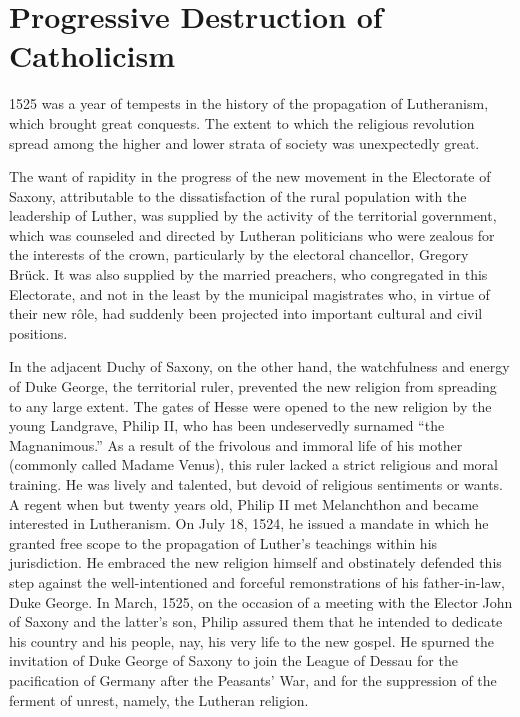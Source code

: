 \section{Progressive Destruction of Catholicism}

1525 was a year of tempests in the history of the propagation of
Lutheranism, which brought great conquests. The extent to which the
religious revolution spread among the higher and lower strata of
society was unexpectedly great.

The want of rapidity in the progress of the new movement in the
Electorate of Saxony, attributable to the dissatisfaction of the rural
population with the leadership of Luther, was supplied by the activity
of the territorial government, which was counseled and directed
by Lutheran politicians who were zealous for the interests of the
crown, particularly by the electoral chancellor, Gregory Brück. It
was also supplied by the married preachers, who congregated in this
Electorate, and not in the least by the municipal magistrates who,
in virtue of their new rôle, had suddenly been projected into important
cultural and civil positions.

In the adjacent Duchy of Saxony, on the other hand, the watchfulness and
energy of Duke George, the territorial ruler, prevented the
new religion from spreading to any large extent.
The gates of Hesse were opened to the new religion by the young
Landgrave, Philip II, who has been undeservedly surnamed ``the
Magnanimous.'' As a result of the frivolous and immoral life of
his mother (commonly called Madame Venus), this ruler lacked
a strict religious and moral training. He was lively and talented,
but devoid of religious sentiments or wants. A regent when but
twenty years old, Philip II met Melanchthon and became interested
in Lutheranism. On July 18, 1524, he issued a mandate in which he
granted free scope to the propagation of Luther’s teachings within his
jurisdiction. He embraced the new religion himself and obstinately
defended this step against the well-intentioned and forceful remonstrations
of his father-in-law, Duke George. In March, 1525, on the
occasion of a meeting with the Elector John of Saxony and the latter’s
son, Philip assured them that he intended to dedicate his country and
his people, nay, his very life to the new gospel. He spurned the invitation
of Duke George of Saxony to join the League of Dessau for the
pacification of Germany after the Peasants’ War, and for the suppression
of the ferment of unrest, namely, the Lutheran religion.

